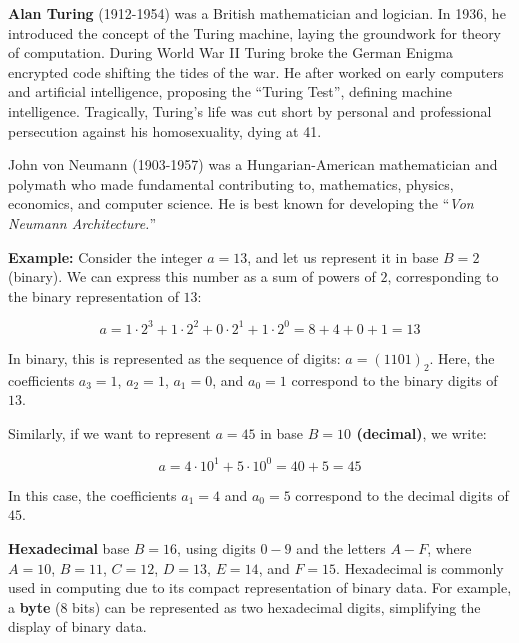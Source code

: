 \begin{Tip}
    \textbf{Alan Turing} (1912-1954) was a British mathematician and logician. In 1936, he introduced the concept of the Turing machine, laying the groundwork for theory of computation. During World War II Turing broke the German Enigma encrypted code shifting the tides of the war. He after worked on early computers and artificial intelligence, proposing the ``Turing Test'', defining machine intelligence. Tragically, Turing's life was cut short by personal and professional persecution against his homosexuality, dying at 41.
\end{Tip}

\newpage

\begin{Tip}
    John von Neumann (1903-1957) was a Hungarian-American mathematician and polymath who made fundamental contributing to, mathematics, physics, economics, and computer science. He is best known for developing the ``\textit{Von Neumann Architecture.}''
\end{Tip}

\noindent
\textbf{Example:} Consider the integer $a = 13$, and let us represent it in base $B = 2$ (binary). We can express this number as a sum of powers of $2$, corresponding to the binary representation of $13$:
    
\[
a = 1 \cdot 2^3 + 1 \cdot 2^2 + 0 \cdot 2^1 + 1 \cdot 2^0 = 8 + 4 + 0 + 1 = 13
\]

\noindent
In binary, this is represented as the sequence of digits: $a = (1101)_2$. Here, the coefficients $a_3 = 1$, $a_2 = 1$, $a_1 = 0$, and $a_0 = 1$ correspond to the binary digits of $13$.

\noindent
Similarly, if we want to represent $a = 45$ in base \textbf{$B = 10$ (decimal)}, we write:

\[
a = 4 \cdot 10^1 + 5 \cdot 10^0 = 40 + 5 = 45
\]

\noindent
In this case, the coefficients $a_1 = 4$ and $a_0 = 5$ correspond to the decimal digits of $45$.


\begin{Def}[Hexadecimal]
    
        \textbf{Hexadecimal} base $B=16$, using digits $0-9$ and the letters $A-F$, where $A=10$, $B=11$, $C=12$, $D=13$, $E=14$, and $F=15$. Hexadecimal is commonly used in computing due to its compact representation of binary data. For example, a \textbf{byte} (8 bits) can be represented as two hexadecimal digits, simplifying the display of binary data.
\end{Def}


